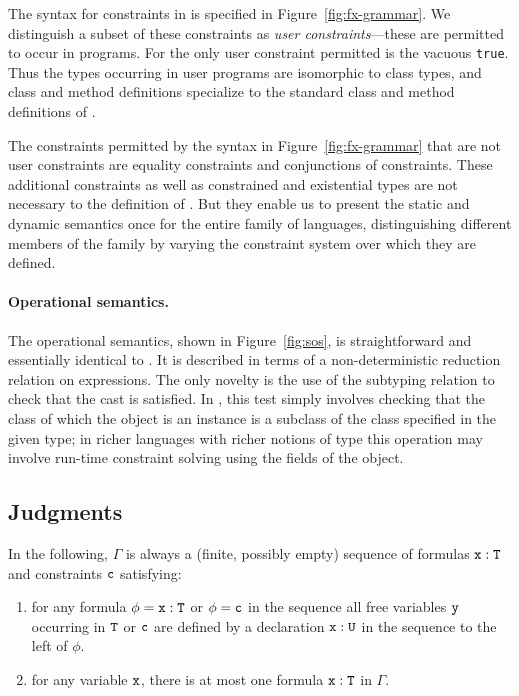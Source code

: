 The syntax for constraints in \FXZ{} is specified in
Figure~\ref{fig:fx-grammar}. We distinguish a subset of these constraints as
{\em user constraints}---these are permitted to occur in
programs. For \FXZ{} the only user constraint permitted is the vacuous
{\tt true}. Thus the types occurring in user programs are isomorphic
to class types, and class and method definitions specialize to the
standard class and method definitions of \FJ{}. 

The constraints permitted by the syntax in
Figure~\ref{fig:fx-grammar} that
are not user constraints are equality constraints and
conjunctions of constraints. These additional constraints as well as constrained and existential types
are not necessary to the definition of \FXZ.
But they enable us to present the static and dynamic
semantics once for the entire family of \FX{} languages,
distinguishing different members of the family by varying the
constraint system over which they are defined.

\paragraph{Operational semantics.}

The operational semantics, shown in Figure~\ref{fig:sos},
is straightforward and essentially identical
to \FJ \cite{FJ}. It is described in terms of a non-deterministic
reduction relation on expressions. The only novelty is the use of the
subtyping relation to check that the cast is satisfied. In \FXZ, this
test simply involves checking that the class of which the object is an
instance is a subclass of the class specified in the given type; in
richer languages with richer notions of type this operation may
involve run-time constraint solving using the fields of the object.


\subsection{Judgments}

In the following, $\Gamma$ is always a
(finite, possibly empty) sequence of formulas $\tt x:T$ and constraints $\tt c$ satisfying:
\begin{enumerate}
  \item for any formula $\phi=\tt x:T$ or $\phi=\tt c$ in the sequence all free variables $\tt y$
  occurring in $\tt T$ or $\tt c$ are defined by a declaration $\tt
  x:U$ in the sequence to the left of $\phi$.

  \item for any variable $\tt x$, there is at most one
  formula $\tt x:T$ in $\Gamma$.
\end{enumerate}

